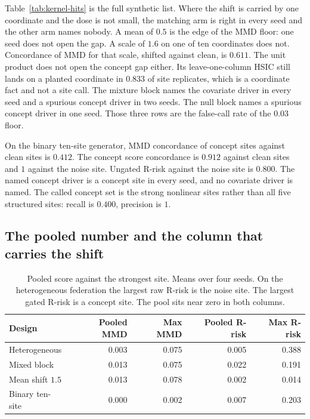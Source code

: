 Table~\ref{tab:kernel-hits} is the full synthetic list.
Where the shift is carried by one coordinate and the dose is not small, the matching arm is right in every seed and the other arm names nobody.
A mean of \(0.5\) is the edge of the MMD floor: one seed does not open the gap.
A scale of \(1.6\) on one of ten coordinates does not.
Concordance of MMD for that scale, shifted against clean, is \(0.611\).
The unit product does not open the concept gap either.
Its leave-one-column HSIC still lands on a planted coordinate in \(0.833\) of site replicates, which is a coordinate fact and not a site call.
The mixture block names the covariate driver in every seed and a spurious concept driver in two seeds.
The null block names a spurious concept driver in one seed.
Those three rows are the false-call rate of the \(0.03\) floor.

On the binary ten-site generator, MMD concordance of concept sites against clean sites is \(0.412\).
The concept score concordance is \(0.912\) against clean sites and \(1\) against the noise site.
Ungated R-risk against the noise site is \(0.800\).
The named concept driver is a concept site in every seed, and no covariate driver is named.
The called concept set is the strong nonlinear sites rather than all five structured sites: recall is \(0.400\), precision is \(1\).

\subsection{The pooled number and the column that carries the shift}
\label{sec:kernel-pool}

\begin{table}[t]
\centering
\caption{Pooled score against the strongest site.
Means over four seeds.
On the heterogeneous federation the largest raw R-risk is the noise site.
The largest gated R-risk is a concept site.
The pool sits near zero in both columns.}
\label{tab:kernel-pool}
\small
\begin{tabular}{lrrrr}
\toprule
Design & Pooled MMD & Max MMD & Pooled R-risk & Max R-risk \\
\midrule
Heterogeneous & 0.003 & 0.075 & 0.005 & 0.388 \\
Mixed block & 0.013 & 0.075 & 0.022 & 0.191 \\
Mean shift \(1.5\) & 0.013 & 0.078 & 0.002 & 0.014 \\
Binary ten-site & 0.000 & 0.002 & 0.007 & 0.203 \\
\bottomrule
\end{tabular}
\end{table}

